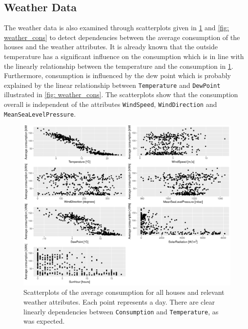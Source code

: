\subsection{Weather Data}
The weather data is also examined through scatterplots given in \cref{fig: weatherpairs} and \cref{fig: weather_cons} to detect dependencies between the average consumption of the houses and the weather attributes. It is already known that the outside temperature has a significant influence on the consumption which is in line with the linearly relationship between the temperature and the consumption in \cref{fig: weatherpairs}. Furthermore, consumption is influenced by the dew point which is probably explained by the linear relationship between \texttt{Temperature} and \texttt{DewPoint} illustrated in \cref{fig: weather_cons}. The scatterplots show that the consumption overall is independent of the attributes \texttt{WindSpeed}, \texttt{WindDirection} and \texttt{MeanSeaLevelPressure}. 
\begin{figure}
    \centering
    \includegraphics[width=1.\textwidth]{../../../figures/weatherpairs.pdf}
    \caption{Scatterplots of the average consumption for all houses and relevant weather attributes. Each point represents a day. There are clear linearly dependencies between \texttt{Consumption} and \texttt{Temperature}, as was expected.}
    \label{fig: weatherpairs}
\end{figure}

